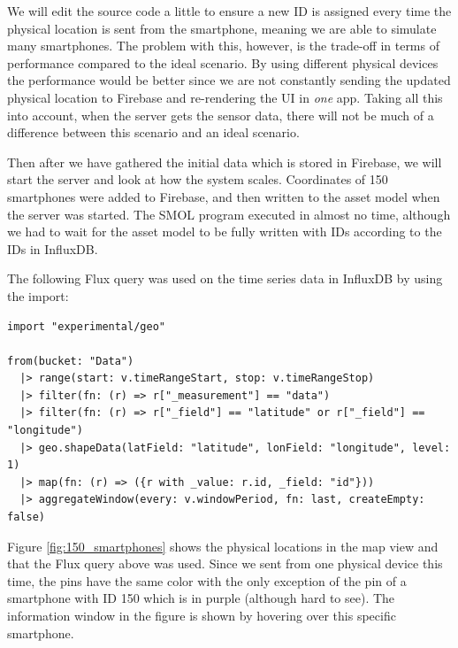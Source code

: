 \documentclass{article}
\begin{document}
We will edit the source code a little to ensure a new ID is assigned every time the physical location is sent from the smartphone, meaning we are able to simulate many smartphones. The problem with this, however, is the trade-off in terms of performance compared to the ideal scenario. By using different physical devices the performance would be better since we are not constantly sending the updated physical location to Firebase and re-rendering the UI in \emph{one} app. Taking all this into account, when the server gets the sensor data, there will not be much of a difference between this scenario and an ideal scenario.

Then after we have gathered the initial data which is stored in Firebase, we will start the server and look at how the system scales. Coordinates of 150 smartphones were added to Firebase, and then written to the asset model when the server was started. The SMOL program executed in almost no time, although we had to wait for the asset model to be fully written with IDs according to the IDs in InfluxDB.

The following Flux query was used on the time series data in InfluxDB by using the import:
\begin{small}
\begin{verbatim}
import "experimental/geo"

from(bucket: "Data")
  |> range(start: v.timeRangeStart, stop: v.timeRangeStop)
  |> filter(fn: (r) => r["_measurement"] == "data")
  |> filter(fn: (r) => r["_field"] == "latitude" or r["_field"] == "longitude")
  |> geo.shapeData(latField: "latitude", lonField: "longitude", level: 1)
  |> map(fn: (r) => ({r with _value: r.id, _field: "id"}))
  |> aggregateWindow(every: v.windowPeriod, fn: last, createEmpty: false)
\end{verbatim}
\end{small}

Figure \ref{fig:150_smartphones} shows the physical locations in the map view and that the Flux query above was used. Since we sent from one physical device this time, the pins have the same color with the only exception of the pin of a smartphone with ID 150 which is in purple (although hard to see). The information window in the figure is shown by hovering over this specific smartphone.
\end{document}
